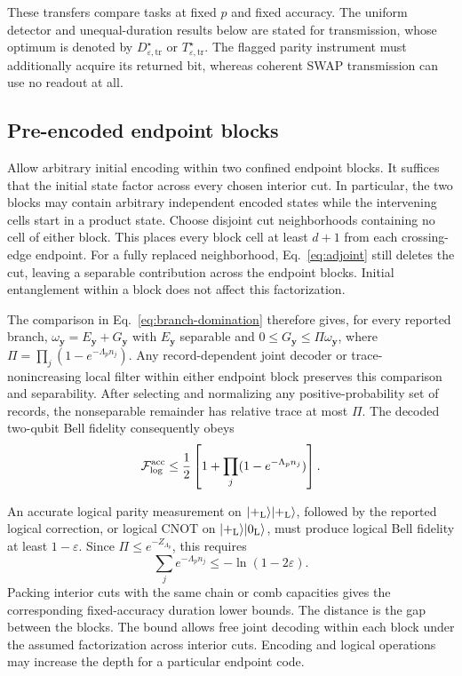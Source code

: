 \documentclass[aps,prl,twocolumn,superscriptaddress,longbibliography,reprint,floatfix]{revtex4-2}
\newcommand{\ket}[1]{\lvert #1\rangle}
\newcommand{\eps}{\varepsilon}
\newcommand{\Dopt}{D_{\eps,\mathrm{tr}}^{\star}}
\newcommand{\Topt}{T_{\eps,\mathrm{tr}}^{\star}}
\begin{document}
These transfers compare tasks at fixed $p$ and fixed accuracy. The
uniform detector and unequal-duration results below are stated for
transmission, whose optimum is denoted by $\Dopt$ or $\Topt$.
The flagged parity instrument must additionally acquire its returned
bit, whereas coherent SWAP transmission can use no readout at all.

\subsection{Pre-encoded endpoint blocks}
\label{sm:encoded-endpoints}
Allow arbitrary initial encoding within two confined endpoint blocks.
It suffices that the initial state factor across every chosen interior
cut. In particular, the two blocks may contain arbitrary independent
encoded states while the intervening cells start in a product state.
Choose disjoint cut neighborhoods containing no cell of either block.
This places every block cell at least $d+1$ from each crossing-edge endpoint. For a
fully replaced neighborhood, Eq.~\eqref{eq:adjoint} still deletes the
cut, leaving a separable contribution across the endpoint blocks.
Initial entanglement within a block does not affect this factorization.

The comparison in Eq.~\eqref{eq:branch-domination} therefore gives, for
every reported branch, $\omega_{\boldsymbol y}=E_{\boldsymbol y}+G_{\boldsymbol y}$ with $E_{\boldsymbol y}$ separable and
$0\le G_{\boldsymbol y}\le\Pi\omega_{\boldsymbol y}$, where
$\Pi=\prod_j(1-e^{-\Lambda_p n_j})$.
Any record-dependent joint decoder or trace-nonincreasing local filter
within either endpoint block preserves this comparison and separability.
After selecting and normalizing any positive-probability set of records,
the nonseparable remainder has relative trace at most $\Pi$.
The decoded two-qubit Bell fidelity consequently obeys
\begin{equation}
 \mathcal F_{\rm log}^{\rm acc}\le
 \frac12\left[1+\prod_j(1-e^{-\Lambda_p n_j})\right].
 \label{eq:encoded-endpoints}
\end{equation}

An accurate logical parity measurement on
$\ket{+_{\rm L}}\ket{+_{\rm L}}$, followed by the reported logical
correction, or logical CNOT on $\ket{+_{\rm L}}\ket{0_{\rm L}}$, must
produce logical Bell fidelity at least $1-\eps$.
Since $\Pi\le e^{-Z_{\Lambda_p}}$, this requires
\begin{equation}
 \sum_j e^{-\Lambda_p n_j}\le -\ln(1-2\eps).
 \label{eq:encoded-report-cost}
\end{equation}
Packing interior cuts with the same chain or comb capacities gives
the corresponding fixed-accuracy duration lower bounds. The distance
is the gap between the blocks. The bound allows free joint decoding within each block under the
assumed factorization across interior cuts. Encoding and logical
operations may increase the depth for a particular endpoint code.
\end{document}
